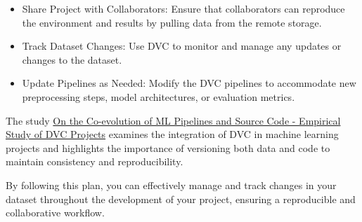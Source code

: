\begin{itemize}
	\medskip
	
	
	
	\medskip
	
	
	\item Share Project with Collaborators: Ensure that collaborators can reproduce the environment and results by pulling data from the remote storage.
			
	\medskip
	
	
	
	
	
	\medskip
	
	
	\item Track Dataset Changes: Use DVC to monitor and manage any updates or changes to the dataset.
	
	\item Update Pipelines as Needed: Modify the DVC pipelines to accommodate new preprocessing steps, model architectures, or evaluation metrics.
	
	\end{itemize}
	
	The study \href{https://ieeexplore.ieee.org/document/9425888}{On the Co-evolution of ML Pipelines and Source Code - Empirical Study of DVC Projects} examines the integration of DVC in machine learning projects and highlights the importance of versioning both data and code to maintain consistency and reproducibility.
	
	By following this plan, you can effectively manage and track changes in your dataset throughout the development of your project, ensuring a reproducible and collaborative workflow.

	
	
